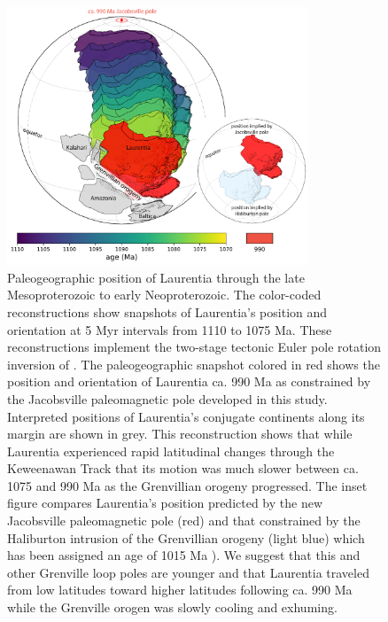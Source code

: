 \documentclass[draft]{agujournal2019}
\begin{document}
\begin{figure}[h!]
\centering
\includegraphics[width=0.8\textwidth]{Jacobsville_paleogeography.pdf}
\caption{Paleogeographic position of Laurentia through the late Mesoproterozoic to early Neoproterozoic. The color-coded reconstructions show snapshots of Laurentia's position and orientation at 5 Myr intervals from 1110 to 1075 Ma. These reconstructions implement the two-stage tectonic Euler pole rotation inversion of . The paleogeographic snapshot colored in red shows the position and orientation of Laurentia ca. 990 Ma as constrained by the Jacobsville paleomagnetic pole developed in this study. Interpreted positions of Laurentia's conjugate continents along its margin are shown in grey. This reconstruction shows that while Laurentia experienced rapid latitudinal changes through the Keweenawan Track that its motion was much slower between ca. 1075 and 990 Ma as the Grenvillian orogeny progressed. The inset figure compares Laurentia's position predicted by the new Jacobsville paleomagnetic pole (red) and that constrained by the Haliburton intrusion of the Grenvillian orogeny (light blue) which has been assigned an age of 1015 Ma \cite{Warnock2000a}). We suggest that this and other Grenville loop poles are younger and that Laurentia traveled from low latitudes toward higher latitudes following ca. 990 Ma while the Grenville orogen was slowly cooling and exhuming.}
\label{fig:paleogeography}
\end{figure}
\end{document}
